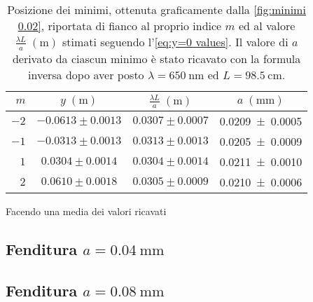 \documentclass[../main.tex]{subfiles}
\begin{document}
\begin{table}[ht!]
    \centering
    \caption{Posizione dei minimi, ottenuta graficamente dalla \autoref{fig:minimi 0.02}, riportata di fianco al proprio indice $m$ ed al valore $\frac{\lambda L}{a} \; (\si{\metre})$ stimati seguendo l'\autoref{eq:y=0 values}. Il valore di $a$ derivato da ciascun minimo è stato ricavato con la formula inversa dopo aver posto $\lambda = \qty{650}{\nm}$ ed $L = \qty{98.5}{\cm}$.}
    \begin{tabular}{r|cc|c}
        \toprule
        $m$  & $y \; (\si{\metre})$ & $\frac{\lambda L}{a} \; (\si{\metre})$ & $a \; (\si{\mm})$ \\
        \midrule
        $-2$ & $-0.0613 \pm 0.0013$ & $0.0307 \pm 0.0007$ & \num{0.0209+-0.0005} \\
        $-1$ & $-0.0313 \pm 0.0013$ & $0.0313 \pm 0.0013$ & \num{0.0205+-0.0009} \\
        $1$  & $0.0304 \pm 0.0014$  & $0.0304 \pm 0.0014$ & \num{0.0211+-0.0010} \\
        $2$  & $0.0610 \pm 0.0018$  & $0.0305 \pm 0.0009$ & \num{0.0210+-0.0006} \\
        \bottomrule
    \end{tabular}
    \label{tab:minimi 0.02}
\end{table}

Facendo una media dei valori ricavati 

\subsection{Fenditura $a = \qty{0.04}{\milli\metre}$}



\subsection{Fenditura $a = \qty{0.08}{\milli\metre}$}




\end{document}
